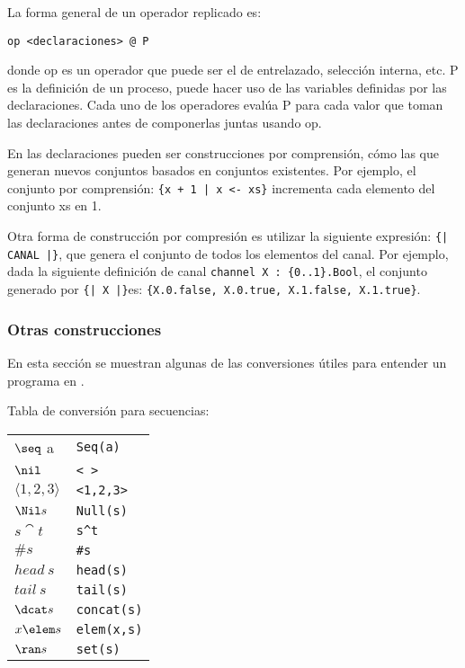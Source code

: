 La forma general de un operador replicado es:

\begin{verbatim}
op <declaraciones> @ P
\end{verbatim}

donde op es un operador que puede ser el de entrelazado, selección interna, etc. P es la definición de un proceso, puede hacer uso de las variables definidas por las declaraciones. Cada uno de los operadores evalúa P para cada valor que toman las declaraciones antes de componerlas juntas usando op.

En \CSPm las declaraciones pueden ser construcciones por comprensión, cómo las que generan nuevos conjuntos basados en conjuntos existentes. Por ejemplo, el conjunto por comprensión: \verb={x + 1 | x <- xs}= incrementa cada elemento del conjunto xs en 1. 

Otra forma de construcción por compresión es utilizar la siguiente expresión: \verb={| CANAL |}=, que genera el conjunto de todos los elementos del canal. Por ejemplo, dada la siguiente definición de canal \verb=channel X : {0..1}.Bool=, el conjunto generado por \verb={| X |}=es: \verb={X.0.false, X.0.true, X.1.false, X.1.true}=.



\subsubsection{Otras construcciones}
En esta sección se muestran algunas de las conversiones útiles para entender un programa en \CSPm.

Tabla de conversión para secuencias:

\begin{center}
\begin{tabular}{ l l }
  $\seq$ a & \verb|Seq(a)| \\
  $\nil$ & \verb|< >| \\
  $\langle 1, 2, 3 \rangle$ & \verb|<1,2,3>| \\
  $\Nil s$ & \verb=Null(s)=
  \\
  $s \cat t$ & \verb=s^t=
  \\
  $\# s$ & \verb|#s|
  \\
  $head~s$ & \verb|head(s)|
  \\
  $tail~s$ & \verb|tail(s)|
  \\
  $\dcat s$ & \verb|concat(s)|
  \\
  $x \elem s$ & \verb=elem(x,s)=
  \\
  $\ran s$ &  \verb|set(s)|
  
\end{tabular}
\end{center}

